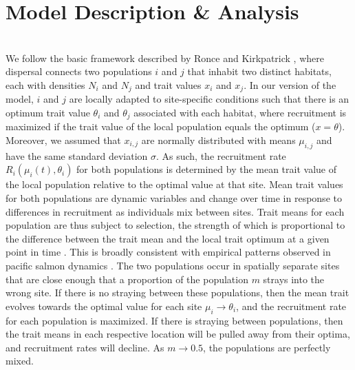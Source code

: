 \documentclass{revtex4}
\begin{document}
\section{Model Description \& Analysis}

\\
\noindent We follow the basic framework described by Ronce and Kirkpatrick \citep{Ronce:2001dp}, where dispersal connects two populations $i$ and $j$ that inhabit two distinct habitats, each with densities $N_i$ and $N_j$ and trait values $x_i$ and $x_j$.
In our version of the model, $i$ and $j$ are locally adapted to site-specific conditions such that there is an optimum trait value $\theta_i$ and $\theta_j$ associated with each habitat, where recruitment is maximized if the trait value of the local population equals the optimum ($x = \theta$).
Moreover, we assumed that $x_{i,j}$ are normally distributed with means $\mu_{i,j}$ and have the same standard deviation $\sigma$.
As such, the recruitment rate $R_i(\mu_i(t),\theta_i)$ for both populations is determined by the mean trait value of the local population relative to the optimal value at that site.
Mean trait values for both populations are dynamic variables and change over time in response to differences in recruitment as individuals mix between sites.
Trait means for each population are thus subject to selection, the strength of which is proportional to the difference between the trait mean and the local trait optimum at a given point in time \citep{simpson1953major,Lande:1976ga,Ronce:2001dp}.
This is broadly consistent with empirical patterns observed in pacific salmon dynamics \citep{Reisenbichler:1988ex}.
The two populations occur in spatially separate sites that are close enough that a proportion of the population $m$ strays into the wrong site.
If there is no straying between these populations, then the mean trait evolves towards the optimal value for each site $\mu_i \rightarrow \theta_i$, and the recruitment rate for each population is maximized.
If there is straying between populations, then the trait means in each respective location will be pulled away from their optima, and recruitment rates will decline.
As $m \rightarrow 0.5$, the populations are perfectly mixed.
\end{document}
